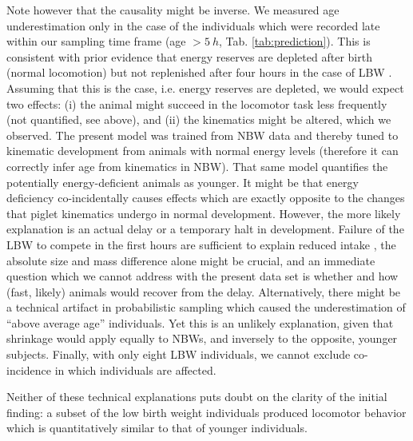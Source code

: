 Note however that the causality might be inverse.
We measured age underestimation only in the case of the individuals which were recorded late within our sampling time frame (age \(> 5\ h\), Tab. \ref{tab:prediction}).
This is consistent with prior evidence that energy reserves are depleted after birth (normal locomotion) but not replenished after four hours in the case of LBW \citep{LeDividich2017,VandenHole2019}.
Assuming that this is the case, i.e. energy reserves are depleted, we would expect two effects: (i) the animal might succeed in the locomotor task less frequently (not quantified, see above), and (ii) the kinematics might be altered, which we observed.
The present model was trained from NBW data and thereby tuned to kinematic development from animals with normal energy levels (therefore it can correctly infer age from kinematics in NBW).
That same model quantifies the potentially energy-deficient animals as younger.
It might be that energy deficiency co-incidentally causes effects which are exactly opposite to the changes that piglet kinematics undergo in normal development.
However, the more likely explanation is an actual delay or a temporary halt in development.
Failure of the LBW to compete in the first hours are sufficient to explain reduced intake \citep{Amdi2013}, the absolute size and mass difference alone might be crucial, and an immediate question which we cannot address with the present data set is whether and how (fast, likely) animals would recover from the delay.
Alternatively, there might be a technical artifact in probabilistic sampling \citep[``shrinkage'', \textit{cf.}][]{Gelman2013} which caused the underestimation of ``above average age'' individuals.
Yet this is an unlikely explanation, given that shrinkage would apply equally to NBWs, and inversely to the opposite, younger subjects.
Finally, with only eight LBW individuals, we cannot exclude co-incidence in which individuals are affected.

Neither of these technical explanations puts doubt on the clarity of the initial finding: a subset of the low birth weight individuals produced locomotor behavior which is quantitatively similar to that of younger individuals.


